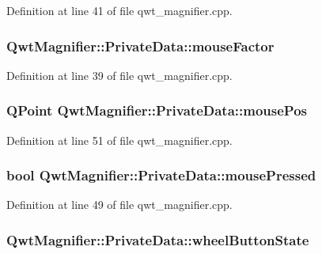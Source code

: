 Definition at line 41 of file qwt\-\_\-magnifier.\-cpp.

\hypertarget{class_qwt_magnifier_1_1_private_data_a6d4ea4f12ed6853124326941e659dd54}{
\subsubsection[{mouse\-Factor}]{ Qwt\-Magnifier\-::\-Private\-Data\-::mouse\-Factor}}\label{class_qwt_magnifier_1_1_private_data_a6d4ea4f12ed6853124326941e659dd54}


Definition at line 39 of file qwt\-\_\-magnifier.\-cpp.

\hypertarget{class_qwt_magnifier_1_1_private_data_a4f8319831a015f9b98c9fa74d3e24909}{
\subsubsection[{mouse\-Pos}]{\setlength{\rightskip}{0pt plus 5cm}Q\-Point Qwt\-Magnifier\-::\-Private\-Data\-::mouse\-Pos}}\label{class_qwt_magnifier_1_1_private_data_a4f8319831a015f9b98c9fa74d3e24909}


Definition at line 51 of file qwt\-\_\-magnifier.\-cpp.

\hypertarget{class_qwt_magnifier_1_1_private_data_abddf9b47b464748b61ae0a1304807a3e}{
\subsubsection[{mouse\-Pressed}]{\setlength{\rightskip}{0pt plus 5cm}bool Qwt\-Magnifier\-::\-Private\-Data\-::mouse\-Pressed}}\label{class_qwt_magnifier_1_1_private_data_abddf9b47b464748b61ae0a1304807a3e}


Definition at line 49 of file qwt\-\_\-magnifier.\-cpp.

\hypertarget{class_qwt_magnifier_1_1_private_data_a13600c69de92bc2b406f91ed869f5a81}{
\subsubsection[{wheel\-Button\-State}]{ Qwt\-Magnifier\-::\-Private\-Data\-::wheel\-Button\-State}}\label{class_qwt_magnifier_1_1_private_data_a13600c69de92bc2b406f91ed869f5a81}


